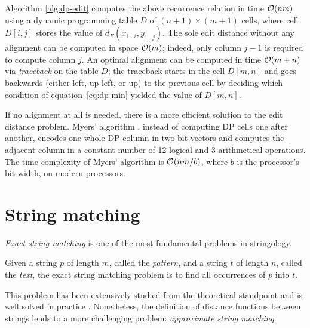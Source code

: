 Algorithm \ref{alg:dp-edit} computes the above recurrence relation in time $\mathcal{O}(nm)$ using a dynamic programming table $D$ of $(n+1) \times (m+1)$ cells, where cell $D[i,j]$ stores the value of $d_E(x_{1 \dots i},y_{1 \dots j})$.
The sole edit distance without any alignment can be computed in space $\mathcal{O}(m)$; indeed, only column $j-1$ is required to compute column $j$.
An optimal alignment can be computed in time $\mathcal{O}(m + n)$ via \emph{traceback} on the table $D$;
the traceback starts in the cell $D[m,n]$ and goes backwards (either left, up-left, or up) to the previous cell by deciding which condition of equation~\ref{eq:dp-min} yielded the value of $D[m,n]$.

If no alignment at all is needed, there is a more efficient solution to the edit distance problem.
Myers' algorithm \citep{Myers1999}, instead of computing DP cells one after another, encodes one whole DP column in two bit-vectors and computes the adjacent column in a constant number of 12 logical and 3 arithmetical operations.
The time complexity of Myers' algorithm is $\mathcal{O}(nm/b)$, where $b$ is the processor's bit-width,  on modern processors.


\section{String matching}

\emph{Exact string matching} is one of the most fundamental problems in stringology.
\begin{definition}
\citep{Gusfield1997}
Given a string $p$ of length $m$, called the \emph{pattern}, and a string $t$ of length $n$, called the \emph{text}, the exact string matching problem is to find all occurrences of $p$ into $t$.
\end{definition}

This problem has been extensively studied from the theoretical standpoint and is well solved in practice \citep{Faro2013}.
Nonetheless, the definition of distance functions between strings lends to a more challenging problem: \emph{approximate string matching}.

